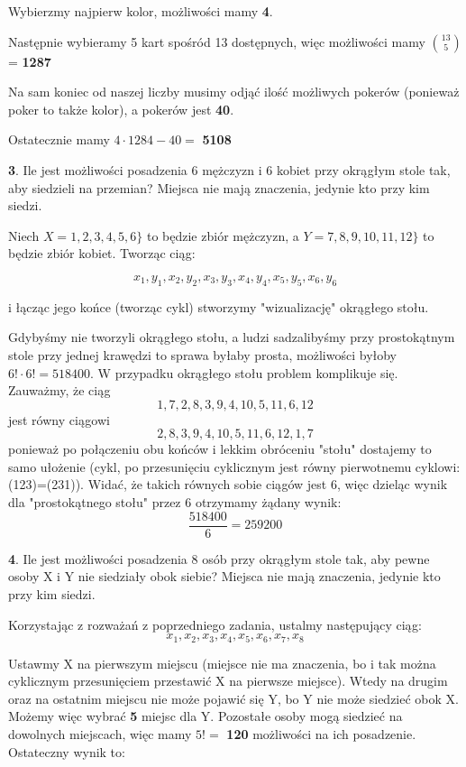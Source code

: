 \documentclass{article}
\begin{document}
Wybierzmy najpierw kolor, możliwości mamy \textbf{4}.

Następnie wybieramy 5 kart spośród 13 dostępnych, więc możliwości mamy $13 \choose 5$ = \textbf{1287}

Na sam koniec od naszej liczby musimy odjąć ilość możliwych pokerów (ponieważ poker to także kolor), a pokerów jest \textbf{40}.

Ostatecznie mamy $4\cdot1284-40=$ \textbf{5108}

\begin{flushleft}
\large \textbf{3}. Ile jest możliwości posadzenia 6 mężczyzn i 6 kobiet przy okrągłym stole tak, aby siedzieli na przemian? Miejsca nie mają znaczenia, jedynie kto przy kim siedzi.
\end{flushleft}
\normalsize{}

Niech $X=1,2,3,4,5,6\}$ to będzie zbiór mężczyzn, a $Y=7,8,9,10,11,12\}$ to będzie zbiór kobiet. Tworząc ciąg:

$$x_1,y_1,x_2,y_2,x_3,y_3,x_4,y_4,x_5,y_5,x_6,y_6$$

i łącząc jego końce (tworząc cykl) stworzymy "wizualizację" okrągłego stołu.

Gdybyśmy nie tworzyli okrągłego stołu, a ludzi sadzalibyśmy przy prostokątnym stole przy jednej krawędzi to sprawa byłaby prosta, możliwości byłoby $6!\cdot6!=518400$. W przypadku okrągłego stołu problem komplikuje się.
Zauważmy, że ciąg
$$1,7,2,8,3,9,4,10,5,11,6,12$$
jest równy ciągowi
$$2,8,3,9,4,10,5,11,6,12,1,7$$
ponieważ po połączeniu obu końców i lekkim obróceniu "stołu" dostajemy to samo ułożenie (cykl, po przesunięciu cyklicznym jest równy pierwotnemu cyklowi: (123)=(231)). Widać, że takich równych sobie ciągów jest 6, więc dzieląc wynik dla "prostokątnego stołu" przez 6 otrzymamy żądany wynik: $$\frac{518400}{6}=259200$$ 

\begin{flushleft}
\large \textbf{4}. Ile jest możliwości posadzenia 8 osób przy okrągłym stole tak, aby pewne osoby X i Y nie siedziały obok siebie? Miejsca nie mają znaczenia, jedynie kto przy kim siedzi.
\end{flushleft}
\normalsize{}
Korzystając z rozważań z poprzedniego zadania, ustalmy następujący ciąg:
$$x_1,x_2,x_3,x_4,x_5,x_6,x_7,x_8$$

Ustawmy X na pierwszym miejscu (miejsce nie ma znaczenia, bo i tak można cyklicznym przesunięciem przestawić X na pierwsze miejsce). Wtedy na drugim oraz na ostatnim miejscu nie może pojawić się Y, bo Y nie może siedzieć obok X. Możemy więc wybrać \textbf{5} miejsc dla Y. Pozostałe osoby mogą siedzieć na dowolnych miejscach, więc mamy $5!=$ \textbf{120} możliwości na ich posadzenie. Ostateczny wynik to:
\end{document}
